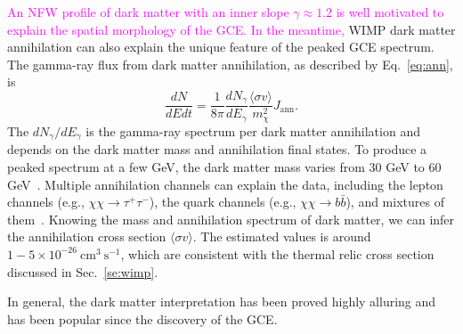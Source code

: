 \documentclass[doublespace,nopageskip]{VTthesis} %
\newcommand{\DS}[1]{\textcolor{magenta}{#1}}
\newcommand{\sigmav}{\langle\sigma v\rangle}
\begin{document}
\DS{An NFW profile of dark matter with an inner slope $\gamma \approx 1.2$ is well motivated to explain the spatial morphology of the GCE. In the meantime,} WIMP dark matter annihilation can also explain the unique feature of the peaked GCE spectrum. 
The gamma-ray flux from dark matter annihilation, as described by Eq.~\ref{eq:ann}, is
\begin{equation}
    \frac{dN}{dEdt} = \frac{1}{8\pi}\frac{dN_\gamma}{dE_\gamma}\frac{\sigmav}{m_\chi^2}J_\mathrm{ann}.
\end{equation}
The $dN_\gamma/dE_\gamma$ is the gamma-ray spectrum per dark matter annihilation and depends on the dark matter mass and annihilation final states. To produce a peaked spectrum at a few GeV, the dark matter mass varies from 30 GeV to 60 GeV~\cite{2011PhRvD..84l3005H, 2012PhRvD..86h3511A,2013PhRvD..88h3521G,2016PDU....12....1D,2015JCAP...03..038C}. Multiple annihilation channels can explain the data, including the lepton channels (e.g., $\chi\chi\to\tau^+\tau^-$), the quark channels (e.g., $\chi\chi\to b\bar{b}$), and mixtures of them~\cite{2011PhRvD..84l3005H, 2012PhRvD..86h3511A,2013PhRvD..88h3521G,2016PDU....12....1D,2015JCAP...03..038C}. Knowing the mass and annihilation spectrum of dark matter, we can infer the annihilation cross section $\sigmav$. The estimated values is around $1 - 5 \times 10^{-26}\ \mathrm{cm}^3\  \mathrm{s}^{-1}$, which are consistent with the thermal relic cross section discussed in Sec.~\ref{se:wimp}.

In general, the dark matter interpretation has been proved highly alluring and has been popular since the discovery of the GCE.





\end{document}
